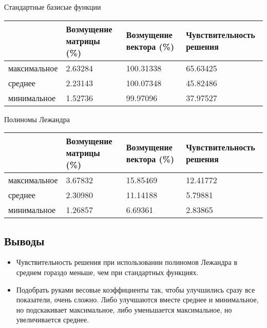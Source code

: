 \documentclass[paper=a4, fontsize=11pt]{scrartcl} %
\numberwithin{equation}{section} %
\numberwithin{figure}{section} %
\numberwithin{table}{section} %
\begin{document}
Стандартные базисые функции

\begin{tabular}{|p{3 cm}|p{4 cm}|p{4 cm}|p{3.5 cm}|}
\hline
& Возмущение матрицы (\%) & Возмущение вектора (\%) & Чувствительность решения\\
\hline
максимальное & 2.63284 & 100.31338 & 65.63425\\
\hline
среднее & 2.23143 & 100.07348 & 45.82486\\
\hline
минимальное & 1.52736 & 99.97096 & 37.97527\\
\hline
\end{tabular}

Полиномы Лежандра

\begin{tabular}{|p{3 cm}|p{4 cm}|p{4 cm}|p{3.5 cm}|}
\hline
& Возмущение матрицы (\%) & Возмущение вектора (\%) & Чувствительность решения\\
\hline
максимальное & 3.67832 & 15.85469 & 12.41772\\
\hline
среднее & 2.30980 & 11.14188 & 5.79881\\
\hline
минимальное & 1.26857 & 6.69361 & 2.83865\\
\hline
\end{tabular}

\subsection{Выводы}
\begin{itemize}
\item Чувствительность решения при использовании полиномов Лежандра в среднем гораздо меньше, чем при стандартных функциях.
\item Подобрать руками весовые коэффициенты так, чтобы улучшились сразу все показатели, очень сложно. Либо улучшаются вместе среднее и минимальное, но подскакивает максимальное, либо уменьшается максимальное, но увеличивается среднее.
\end{itemize}
\end{document}
